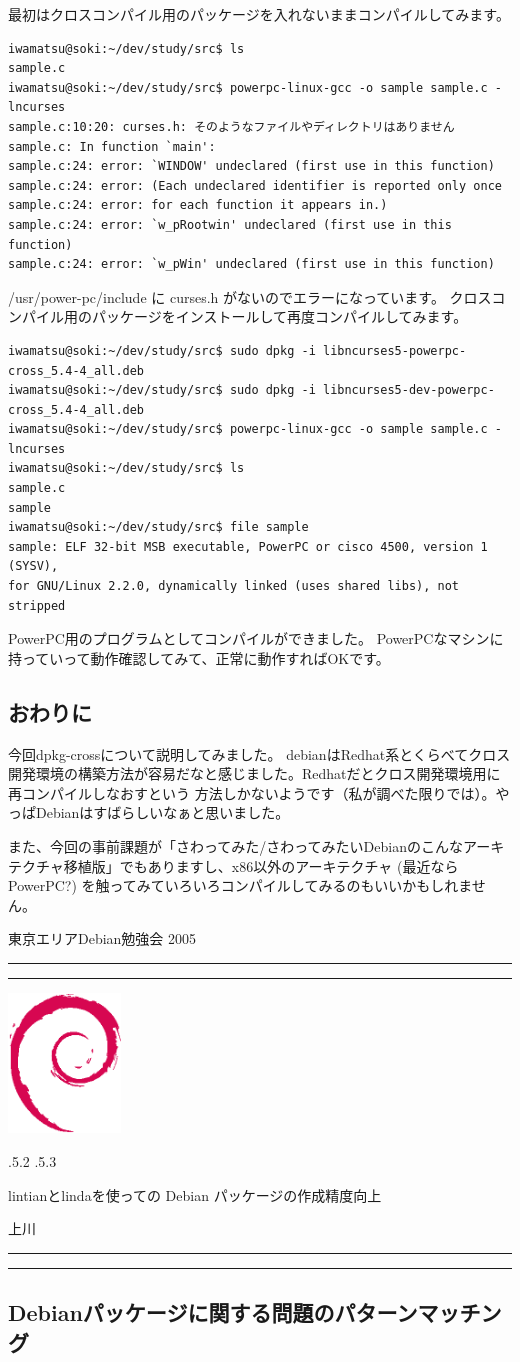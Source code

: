 \documentclass[mingoth]{jsarticle}
\makeatletter
\renewcommand{\section}{\@startsection{section}{1}{\z@}%
    {\Cvs \@plus.5\Cdp \@minus.2\Cdp}%
    {.5\Cvs \@plus.3\Cdp}%
    {\normalfont\Large\headfont\raggedright\centering}} %
\newcommand{\dancersection}[2]{%
\newpage
東京エリアDebian勉強会 2005
\hrule
\vspace{0.5mm}
\hrule
\hfill{}\includegraphics[width=3cm]{image200502/openlogo-nd.eps}\\
\vspace{-4cm}
\begin{center}
  \section{#1}
\end{center}
\hfill{}#2\hspace{3cm}\space\\
\hrule
\hrule
\vspace{1cm}
}
\makeatother
\begin{document}
最初はクロスコンパイル用のパッケージを入れないままコンパイルしてみます。
\begin{verbatim}
iwamatsu@soki:~/dev/study/src$ ls
sample.c
iwamatsu@soki:~/dev/study/src$ powerpc-linux-gcc -o sample sample.c -lncurses
sample.c:10:20: curses.h: そのようなファイルやディレクトリはありません
sample.c: In function `main':
sample.c:24: error: `WINDOW' undeclared (first use in this function)
sample.c:24: error: (Each undeclared identifier is reported only once
sample.c:24: error: for each function it appears in.)
sample.c:24: error: `w_pRootwin' undeclared (first use in this function)
sample.c:24: error: `w_pWin' undeclared (first use in this function)
\end{verbatim}

/usr/power-pc/include に curses.h がないのでエラーになっています。
クロスコンパイル用のパッケージをインストールして再度コンパイルしてみます。
\begin{verbatim}
iwamatsu@soki:~/dev/study/src$ sudo dpkg -i libncurses5-powerpc-cross_5.4-4_all.deb
iwamatsu@soki:~/dev/study/src$ sudo dpkg -i libncurses5-dev-powerpc-cross_5.4-4_all.deb
iwamatsu@soki:~/dev/study/src$ powerpc-linux-gcc -o sample sample.c -lncurses
iwamatsu@soki:~/dev/study/src$ ls
sample.c
sample
iwamatsu@soki:~/dev/study/src$ file sample
sample: ELF 32-bit MSB executable, PowerPC or cisco 4500, version 1 (SYSV), 
for GNU/Linux 2.2.0, dynamically linked (uses shared libs), not stripped
\end{verbatim}
PowerPC用のプログラムとしてコンパイルができました。
PowerPCなマシンに持っていって動作確認してみて、正常に動作すればOKです。

\subsection{おわりに}
今回dpkg-crossについて説明してみました。
debianはRedhat系とくらべてクロス開発環境の構築方法が容易だなと感じました。Redhatだとクロス開発環境用に再コンパイルしなおすという
方法しかないようです（私が調べた限りでは）。やっぱDebianはすばらしいなぁと思いました。

また、今回の事前課題が「さわってみた/さわってみたいDebianのこんなアーキテクチャ移植版」でもありますし、x86以外のアーキテクチャ
(最近ならPowerPC?) を触ってみていろいろコンパイルしてみるのもいいかもしれません。

\dancersection{lintianとlindaを使っての 
Debian パッケージの作成精度向上}{上川}

\subsection{Debianパッケージに関する問題のパターンマッチング}
\end{document}
